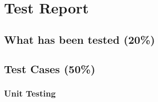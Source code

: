 \section{Test Report}

\subsection{What has been tested (20\%)}

\subsection{Test Cases (50\%)}





\subsubsection{Unit Testing}


